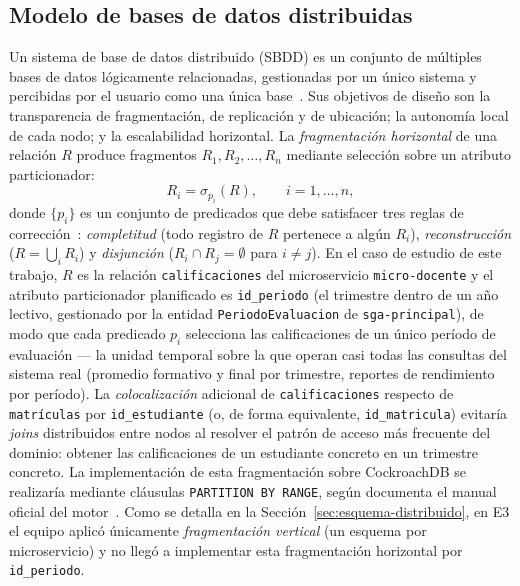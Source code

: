 \documentclass[12pt,a4paper]{article}
\begin{document}
\subsection{Modelo de bases de datos distribuidas}
\label{sec:fundamento-bdd}

Un sistema de base de datos distribuido (SBDD) es un conjunto de múltiples
bases de datos lógicamente relacionadas, gestionadas por un único sistema y
percibidas por el usuario como una única base~\cite{ozsu2020principles}. Sus
objetivos de diseño son la transparencia de fragmentación, de replicación y
de ubicación; la autonomía local de cada nodo; y la escalabilidad
horizontal. La \emph{fragmentación horizontal} de una relación $R$ produce
fragmentos $R_1, R_2, \dots, R_n$ mediante selección sobre un atributo
particionador:
\begin{equation}
  R_i = \sigma_{p_i}(R), \qquad i = 1, \dots, n,
  \label{eq:fragmentacion}
\end{equation}
donde $\{p_i\}$ es un conjunto de predicados que debe satisfacer tres reglas
de corrección~\cite{ozsu2020principles}: \emph{completitud} (todo registro
de $R$ pertenece a algún $R_i$), \emph{reconstrucción} ($R = \bigcup_i R_i$)
y \emph{disjunción} ($R_i \cap R_j = \emptyset$ para $i \neq j$). En el caso
de estudio de este trabajo, $R$ es la relación \texttt{calificaciones} del
microservicio \texttt{micro-docente} y el atributo particionador planificado
es \texttt{id\_periodo} (el trimestre dentro de un año lectivo, gestionado por
la entidad \texttt{PeriodoEvaluacion} de \texttt{sga-principal}), de modo
que cada predicado $p_i$ selecciona las calificaciones de un único período
de evaluación --- la unidad temporal sobre la que operan casi todas las
consultas del sistema real (promedio formativo y final por trimestre,
reportes de rendimiento por período). La \emph{colocalización} adicional de
\texttt{calificaciones} respecto de \texttt{matrículas} por
\texttt{id\_estudiante} (o, de forma equivalente, \texttt{id\_matricula})
evitaría \emph{joins} distribuidos entre nodos al resolver el patrón de acceso
más frecuente del dominio: obtener las calificaciones de un estudiante
concreto en un trimestre concreto. La implementación de esta fragmentación
sobre CockroachDB se realizaría mediante cláusulas \texttt{PARTITION BY
RANGE}, según documenta el manual oficial del motor~\cite{cockroachlabs2024docs}.
Como se detalla en la Sección~\ref{sec:esquema-distribuido}, en E3 el
equipo aplicó únicamente \emph{fragmentación vertical} (un esquema por
microservicio) y no llegó a implementar esta fragmentación horizontal por
\texttt{id\_periodo}.
\end{document}
